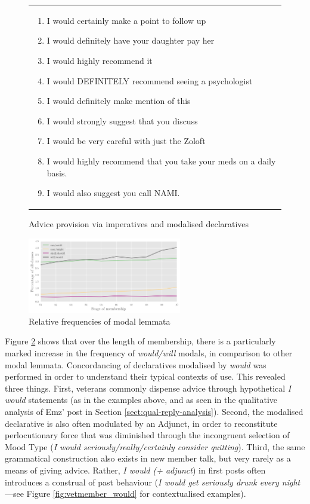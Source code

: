 \begin{figure}
\begin{tabular}[t]{@{}>{\raggedright\arraybackslash}p{}@{}}
    \begin{enumerate}  [before=\itshape,font=\normalfont] \singlespacing \setlength\itemsep{0em} \footnotesize
    \item I would certainly make a point to follow up
    \item I would definitely have your daughter pay her
    \item I would highly recommend it
    \item I would DEFINITELY recommend seeing a psychologist
    \item I would definitely make mention of this
    \item I would strongly suggest that you discuss
    \item I would be very careful with just the Zoloft
    \item I would highly recommend that you take your meds on a daily basis.
    \item I would also suggest you call NAMI.
    \end{enumerate}
    \end{tabular}
    \caption{Advice provision via imperatives and modalised declaratives}
    \label{fig:imp_and_mod}
    \end{figure}
    \begin{figure}[htb]
    \centering
    \includegraphics[width=0.6\textwidth]{../images/modalnew.png}
    \caption{Relative frequencies of modal lemmata}
    \label{fig:modals}
    \end{figure}
%
Figure \ref{fig:modals} shows that over the length of membership, there is a particularly marked increase in the frequency of \emph{would\slash will} modals, in comparison to other modal lemmata. Concordancing of declaratives modalised by \emph{would} was performed in order to understand their typical contexts of use. This revealed three things. First, veterans commonly dispense advice through hypothetical \emph{I would} statements (as in the examples above, and as seen in the qualitative analysis of Emz' post in Section \ref{sect:qual-reply-analysis}). Second, the modalised declarative is also often modulated by an Adjunct, in order to reconstitute perlocutionary force that was diminished through the incongruent selection of Mood Type (\emph{I would seriously\slash really\slash certainly consider quitting}). Third, the same grammatical construction also exists in new \gls{member} talk, but very rarely as a means of giving advice. Rather, \emph{I would (+ adjunct}) in first \glspl{post} often introduces a construal of past behaviour (\emph{I would get seriously drunk every night}---see Figure \ref{fig:vetmember_would} for contextualised examples).

